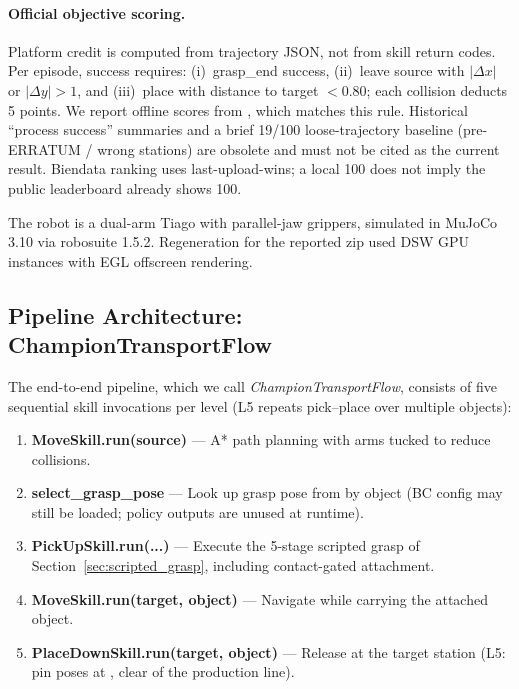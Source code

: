 \paragraph{Official objective scoring.} Platform credit is computed from trajectory JSON, not from skill return codes. Per episode, success requires: (i)~grasp\_end success, (ii)~leave source with $|\Delta x|$ or $|\Delta y|>1$, and (iii)~place with distance to target $<0.80$; each collision deducts 5 points. We report offline scores from , which matches this rule. Historical ``process success'' summaries and a brief 19/100 loose-trajectory baseline (pre-ERRATUM / wrong stations) are obsolete and must not be cited as the current result. Biendata ranking uses last-upload-wins; a local 100 does not imply the public leaderboard already shows 100.

The robot is a dual-arm Tiago with parallel-jaw grippers, simulated in MuJoCo 3.10 via robosuite 1.5.2. Regeneration for the reported zip used DSW GPU instances with EGL offscreen rendering.

\subsection{Pipeline Architecture: ChampionTransportFlow}
\label{sec:experiments:pipeline}

The end-to-end pipeline, which we call \emph{ChampionTransportFlow}, consists of five sequential skill invocations per level (L5 repeats pick--place over multiple objects):

\begin{enumerate}[leftmargin=*,itemsep=2pt]
    \item \textbf{MoveSkill.run(source)} --- A* path planning with arms tucked to reduce collisions.
    \item \textbf{select\_grasp\_pose} --- Look up grasp pose from  by object (BC config may still be loaded; policy outputs are unused at runtime).
    \item \textbf{PickUpSkill.run(...)} --- Execute the 5-stage scripted grasp of Section~\ref{sec:scripted_grasp}, including contact-gated attachment.
    \item \textbf{MoveSkill.run(target, object)} --- Navigate while carrying the attached object.
    \item \textbf{PlaceDownSkill.run(target, object)} --- Release at the target station (L5: pin poses at , clear of the production line).
\end{enumerate}

